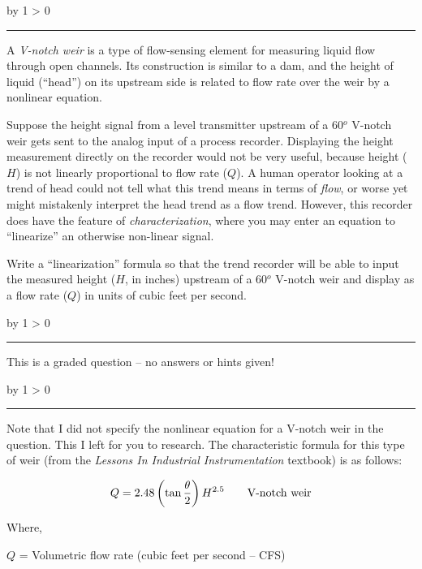\documentclass[12pt,a4paper]{article}
\def\oppgave{
            \advance\questnum by 1
            \ifnum \questnum > 0
                 \hrule
                 \vskip 3pt
                 \leftline{Oppgave \the\questnum}
                 \vskip 3pt \fi}
\def\svar{
           \advance\answnum by 1
           \ifnum \answnum > 0
                \hrule
                \vskip 3pt
                \leftline{Svar \the\answnum}
                \vskip 3pt \fi}
\def\notes{
           \advance\explnum by 1
           \ifnum \explnum > 0
                \hrule
                \vskip 3pt
                \leftline{Notes \the\explnum}
                \vskip 3pt \fi}
\begin{document}
\oppgave{} 

A {\it V-notch weir} is a type of flow-sensing element for measuring liquid flow through open channels.  Its construction is similar to a dam, and the height of liquid (``head'') on its upstream side is related to flow rate over the weir by a nonlinear equation.

Suppose the height signal from a level transmitter upstream of a 60$^{o}$ V-notch weir gets sent to the analog input of a process recorder.  Displaying the height measurement directly on the recorder would not be very useful, because height ($H$) is not linearly proportional to flow rate ($Q$).  A human operator looking at a trend of head could not tell what this trend means in terms of {\it flow}, or worse yet might mistakenly interpret the head trend as a flow trend.  However, this recorder does have the feature of {\it characterization}, where you may enter an equation to ``linearize'' an otherwise non-linear signal.

\vskip 10pt

Write a ``linearization'' formula so that the trend recorder will be able to input the measured height ($H$, in inches) upstream of a 60$^{o}$ V-notch weir and display as a flow rate ($Q$) in units of cubic feet per second.

\vfil 

\eject
\vskip 10pt \filbreak 





\svar{} 

This is a graded question -- no answers or hints given!

\vskip 10pt \filbreak 





\notes{} 

Note that I did not specify the nonlinear equation for a V-notch weir in the question.  This I left for you to research.  The characteristic formula for this type of weir (from the {\it Lessons In Industrial Instrumentation} textbook) is as follows:

$$Q = 2.48 \left( \tan {\theta \over 2} \right) H^{2.5} \hbox{\hskip 20pt V-notch weir}$$

\noindent
Where,

$Q$ = Volumetric flow rate (cubic feet per second -- CFS)
\end{document}
